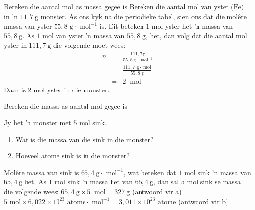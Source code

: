       \begin{wex}{Bereken die aantal mol as massa gegee is}{
      \label{m38717*id276776} Bereken die aantal mol van yster $\text{(Fe)}$ in 'n $11,7 ~\text{g}$ monster.  }
{
As ons kyk na die periodieke tabel, sien ons dat die molêre massa van yster $55,8 \text{ g} \cdot \text{ mol}^{-1}$ is. Dit beteken $1$ mol yster het 'n massa van $55,8 ~\text{g}$.
      \label{m38717*id276848}As $1$ mol van yster 'n massa van $55,8 \text{ g}$, het, dan volg dat die aantal mol yster in $111,7 ~\text{g}$  die volgende moet wees: 
\begin{eqnarray*}
n & = & \frac{111,7 ~\text{g}}{55,8 ~\text{g} \cdot{\text{ mol}}^{-1}} \\
 & = & \frac{111,7 \text{ g} \cdot \text{ mol}}{55,8 \text{ g}} \\
 & = & 2 ~\text{ mol}
\end{eqnarray*}
Daar is $2$ mol yster in die monster.
}
    \end{wex}

      \begin{wex}{Bereken die massa as aantal mol gegee is }{
      \label{m38717*id276928}Jy het 'n monster met $5$ mol sink.
      \label{m38717*id276934}\begin{enumerate}[noitemsep, label=\textbf{\alph*}. ] 
            \label{m38717*uid12}\item Wat is die massa van die sink in die monster?
\label{m38717*uid13}\item Hoeveel atome sink is in die monster?
\end{enumerate}
}
{
      \label{m38717*id276984} Mol\^{e}re massa van sink is $65,4 ~\text{g} \cdot \text{ mol}^{-1}$, wat beteken dat $1$ mol sink 'n massa van $65,4 ~\text{g}$ het.
      \label{m38717*id277021}As $1$ mol sink 'n massa het van $65,4 ~\text{g}$, dan sal $5$ mol sink se massa die volgende wees: $65,4 ~\text{g} \times 5 ~\text{ mol}=327 ~\text{g}$ (antwoord vir a) 
$5 \text{ mol} \times 6,022 \times {10}^{23} \text{ atome} \cdot \text{ mol}^{-1} = 3,011 \times {10}^{23} \text{ atome}$
      \label{m38717*id277263}(antwoord vir b)
}
    \end{wex}
            


